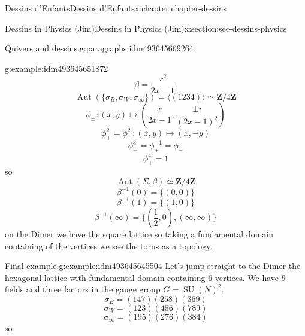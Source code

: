 \documentclass[oneside,10pt,]{book}
\numberwithin{equation}{section}
\newcommand{\inv}{^{-1}}
\newcommand{\ZZ}{\mathbf{Z}}
\DeclareMathOperator{\Aut}{Aut}
\DeclareMathOperator{\specialunitary}{SU}
\begin{document}
\begin{chapterptx}{Dessins d'Enfants}{}{Dessins d'Enfants}{}{}{x:chapter:chapter-dessins}
\begin{sectionptx}{Dessins in Physics (Jim)}{}{Dessins in Physics (Jim)}{}{}{x:section:sec-dessins-physics}
\begin{paragraphs}{Quivers and dessins.}{g:paragraphs:idm493645669264}
\begin{example}{}{g:example:idm493645651872}
\begin{equation*}
\end{equation*}
%
\begin{equation*}
\beta = \frac{x^2}{2x-1}\text{.}
\end{equation*}
%
\begin{equation*}
\Aut(\{\sigma_B,\sigma_W, \sigma_\infty\}) = \langle (1234) \rangle \simeq \ZZ/4\ZZ
\end{equation*}
%
\begin{equation*}
\phi_\pm \colon (x,y) \mapsto \left(\frac{x}{2x -1},\frac{\pm i}{(2x-1)^2} \right)
\end{equation*}
%
\begin{equation*}
\phi_+^2 = \phi_-^2 \colon (x,y) \mapsto (x,-y)
\end{equation*}
%
\begin{equation*}
\phi_+^3 = \phi_+\inv = \phi_-
\end{equation*}
%
\begin{equation*}
\phi_+^4 = 1
\end{equation*}
so%
\begin{equation*}
\Aut(\Sigma, \beta) \simeq \ZZ/4\ZZ
\end{equation*}
%
\begin{equation*}
\beta\inv(0)= \{(0,0)\}
\end{equation*}
%
\begin{equation*}
\beta\inv(1)= \{(1,0)\}
\end{equation*}
%
\begin{equation*}
\beta\inv(\infty)= \{(\frac 12,0), (\infty,\infty)\}
\end{equation*}
on the Dimer we have the square lattice so taking a fundamental domain containing  of the vertices we see the torus as a topology.%
\end{example}
\begin{example}{Final example.}{g:example:idm493645645504}%
Let's jump straight to the Dimer the hexagonal lattice with fundamental domain containing 6 vertices. We have 9 fields and three factors in the gauge group \(G = \specialunitary (N)^2\).%
\begin{equation*}
\sigma_B = (147)(258)(369)
\end{equation*}
%
\begin{equation*}
\sigma_W = (123)(456)(789)
\end{equation*}
%
\begin{equation*}
\sigma_\infty = (195)(276)(384)
\end{equation*}
so%
\begin{equation*}

\end{equation*}
\end{example}
\end{paragraphs}
\end{sectionptx}
\end{chapterptx}
\end{document}
